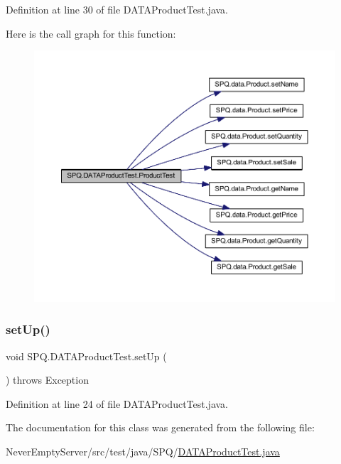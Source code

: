 Definition at line 30 of file D\+A\+T\+A\+Product\+Test.\+java.

Here is the call graph for this function\+:
\nopagebreak
\begin{figure}[H]
\begin{center}
\leavevmode
\includegraphics[width=350pt]{class_s_p_q_1_1_d_a_t_a_product_test_afb49da7389a7f4f42159adf87b4a11be_cgraph}
\end{center}
\end{figure}
\mbox{\label{class_s_p_q_1_1_d_a_t_a_product_test_a64e9238fb4b99af0cdf55768230b4c89}} 
\subsubsection{\texorpdfstring{set\+Up()}{setUp()}}
{\footnotesize\ttfamily void S\+P\+Q.\+D\+A\+T\+A\+Product\+Test.\+set\+Up (\begin{DoxyParamCaption}{ }\end{DoxyParamCaption}) throws Exception}



Definition at line 24 of file D\+A\+T\+A\+Product\+Test.\+java.



The documentation for this class was generated from the following file\+:\begin{DoxyCompactItemize}
\item 
Never\+Empty\+Server/src/test/java/\+S\+P\+Q/\mbox{\hyperlink{_d_a_t_a_product_test_8java}{D\+A\+T\+A\+Product\+Test.\+java}}\end{DoxyCompactItemize}
